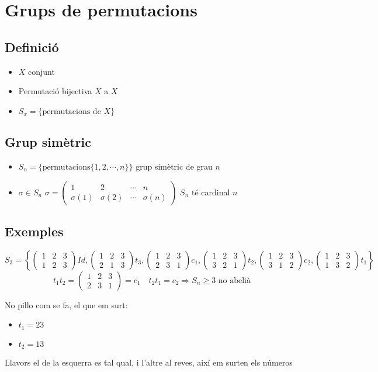 \documentclass[a4paper,10pt]{article}
\newcommand{\red}[1]{{\color{red}#1}}
\newcommand{\pM}[1]{\begin{pmatrix}#1\end{pmatrix}}
\begin{document}
\section{Grups de permutacions}
\subsection*{Definició}
\begin{itemize}
\item $X$ conjunt
\item Permutació bijectiva $X$ a $X$
\item $S_x = \{\text{permutacions de } X\}$
\end{itemize}
\subsection*{Grup simètric}
\begin{itemize}
\item $S_n = \{\text{permutacions} \{1, 2, \cdots, n\}\}$ grup simètric de grau $n$
\item $\sigma \in S_n$
	\subitem $\sigma = \begin{pmatrix}1&2&\cdots&n\\\sigma(1)&\sigma(2)&\cdots&\sigma(n)\end{pmatrix}$ $S_n$ té \red{cardinal} $n$
\end{itemize}
\subsection*{Exemples}
$$S_3 = \left\{\begin{pmatrix}1&2&3\\1&2&3\end{pmatrix}Id, \begin{pmatrix}1&2&3\\2&1&3\end{pmatrix}t_3,\pM{1&2&3\\2&3&1}c_1,\pM{1&2&3\\3&2&1}t_2,\pM{1&2&3\\3&1&2}c_2,\pM{1&2&3\\1&3&2}t_1\right\}$$
$$t_1 t_2 = \pM{1&2&3\\2&3&1} = c_1\quad t_2 t_1 = c_2 \Rightarrow S_n\ge 3\text{ no abelià}$$
\red{No pillo com se fa, el que em surt:
\begin{itemize}
\item $t_1 = 23$
\item $t_2 = 13$
\end{itemize}Llavors el de la esquerra es tal qual, i l'altre al reves, així em surten els números}
\end{document}
